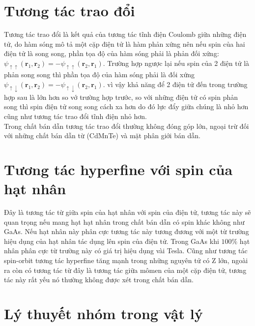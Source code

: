   \section{Tương tác trao đổi}
  Tương tác trao đổi là kết quả của tương tác tĩnh điện Coulomb giữa những điện tử, do hàm sóng mô tả một cặp điện tử là hàm phản xứng nên nếu spin của hai điện tử là song song, phần tọa độ của hàm sóng phải là phản đối xứng:$\psi_{\uparrow\uparrow}\left(\mathbf{r}_1,\mathbf{r}_2\right)=-\psi_{\uparrow\uparrow}\left(\mathbf{r}_2,\mathbf{r}_1\right)$. Trường hợp ngược lại nếu spin của 2 điện tử là phản song song thì phần tọa độ của hàm sóng phải là đối xứng $\psi_{\uparrow\downarrow}\left(\mathbf{r}_1,\mathbf{r}_2\right)=-\psi_{\uparrow\downarrow}\left(\mathbf{r}_2,\mathbf{r}_1\right)$. vì vậy khả năng để 2 điện tử đến trong trường hợp sau là lớn hơn so vớ trường hợp trước, so với những điện tử có spin phản song thì spin điện tử song song cách xa hơn do đó lực đẩy giữa chúng là nhỏ hơn cũng như tương tác trao đổi tĩnh điện nhỏ hơn.\\
  Trong chất bán dẫn tương tác trao đổi thường không đóng góp lớn, ngoại trừ đối với những chất bán dẫn từ (CdMnTe) và mặt phân giới bán dẫn. 
  \section{Tương tác hyperfine với spin của hạt nhân}
  Đây là tương tác từ giữa spin của hạt nhân với spin của điện tử, tương tác này sẽ quan trọng nếu mang hạt hạt nhân trong chất bán dẫn có spin khác không như GaAs. Nếu hạt nhân này phân cực tương tác này tương đương với một từ trường hiệu dụng của hạt nhân tác dụng lên spin của điện tử. Trong GaAs khi $100\%$ hạt nhân phân cực từ trường này có giá trị hiệu dụng vài Tesla. Cũng như tương tác spin-orbit tương tác hyperfine tăng mạnh trong những nguyên tử có Z lớn, ngoài ra còn có tương tác từ đây là tương tác giữa mômen của một cặp điện tử, tương tác này rất yếu nó thường không được xét trong chất bán dẫn.
 


  \section{Lý thuyết nhóm trong vật lý}
